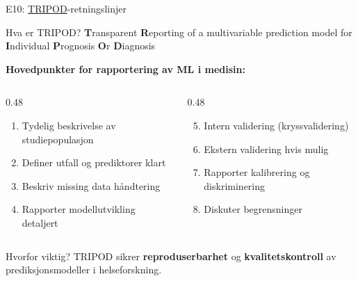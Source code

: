 \documentclass[aspectratio=169, 10pt]{beamer}
\begin{document}
\begin{frame}{E10: \href{https://www.tripod-statement.org/}{TRIPOD}-retningslinjer}

    \begin{block}{Hva er TRIPOD?}
        \textbf{T}ransparent \textbf{R}eporting of a multivariable prediction model for \textbf{I}ndividual \textbf{P}rognosis \textbf{O}r \textbf{D}iagnosis
    \end{block}
    
    \vspace{3mm}
    
    \textbf{Hovedpunkter for rapportering av ML i medisin:}
    
    \begin{columns}
        \begin{column}{0.48\textwidth}
            \begin{enumerate}
                \item Tydelig beskrivelse av studiepopulasjon
                \item Definer utfall og prediktorer klart
                \item Beskriv missing data håndtering
                \item Rapporter modellutvikling detaljert
            \end{enumerate}
        \end{column}
        
        \begin{column}{0.48\textwidth}
            \begin{enumerate}
                \setcounter{enumi}{4}
                \item Intern validering (kryssvalidering)
                \item Ekstern validering hvis mulig
                \item Rapporter kalibrering og diskriminering
                \item Diskuter begrensninger
            \end{enumerate}
        \end{column}
    \end{columns}
    
    \vspace{5mm}
    
    \begin{alertblock}{Hvorfor viktig?}
        TRIPOD sikrer \textbf{reproduserbarhet} og \textbf{kvalitetskontroll} av prediksjonsmodeller i helseforskning.
    \end{alertblock}
    
\end{frame}
\end{document}
